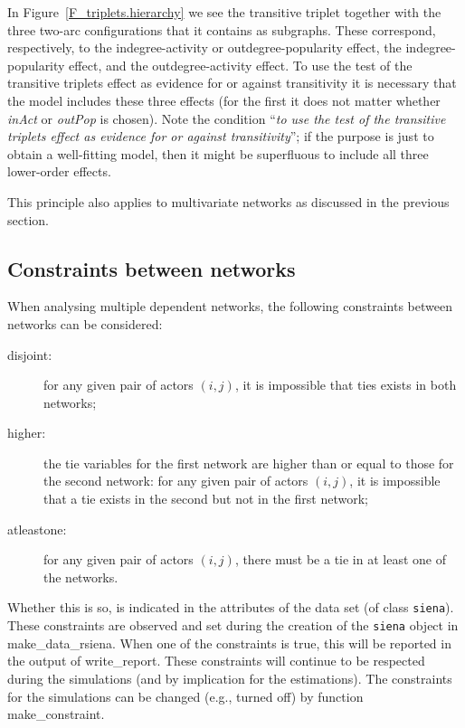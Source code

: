 \documentclass[a4paper,fleqn,11pt]{article}
\newcommand{\+}{\, + \,}
\newcommand{\sfn}[1]{\textsf{#1}}
\begin{document}
In Figure~\ref{F_triplets.hierarchy} we see
the transitive triplet together with the three two-arc
configurations that it contains as subgraphs.
These correspond, respectively, to the indegree-activity
or outdegree-popularity effect, the indegree-popularity effect,
and the outdegree-activity effect.
To use the test of the transitive triplets effect
as evidence for or against transitivity it is necessary
that the model includes these three effects (for the first
it does not matter whether \textit{inAct} or \textit{outPop}
is chosen).
Note the condition ``\textit{to use the test of the transitive triplets effect
as evidence for or against transitivity}'';
if the purpose is just to obtain a well-fitting model,
then it might be superfluous to include all three lower-order effects.

This principle also applies to multivariate networks as discussed
in the previous section.



\subsection{Constraints between networks}
\label{S_constraints}

When analysing multiple dependent networks, the following constraints
between networks can be considered:
\begin{description}
  \item[disjoint:] for any given pair of actors $(i,j)$,
      it is impossible that ties exists in both networks;
  \item[higher:] the tie variables for the first network
      are higher than or equal to those for the second network:
      for any given pair of actors $(i,j)$,
      it is impossible that a tie exists in the second
      but not in the first network;
  \item[atleastone:] for any given pair of actors $(i,j)$,
     there must be a tie in at least one of the networks.
\end{description}
Whether this is so, is indicated in the attributes of the data set
(of class \texttt{siena}).
These constraints are observed and set during the creation of the
\texttt{siena} object in \textsf{make\_data\_rsiena}.
When one of the constraints is true,
this will be reported in the output of \textsf{write\_report}.
These constraints will continue to be respected during the simulations
(and by implication for the estimations).
The constraints for the simulations can be changed
(e.g., turned off) by function \sfn{make\_constraint}.
\end{document}
